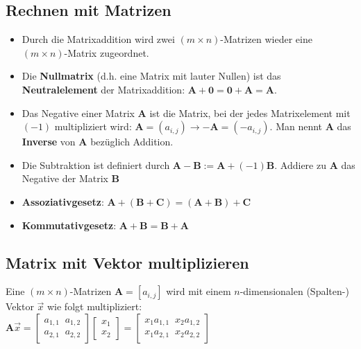 \documentclass[../main.tex]{subfiles}
\begin{document}
\subsection{Rechnen mit Matrizen}
\begin{itemize}
    \item Durch die Matrixaddition wird zwei $(m\times n)$-Matrizen wieder eine $(m\times n)$-Matrix zugeordnet.
    \item Die \textbf{Nullmatrix} (d.h. eine Matrix mit lauter Nullen) ist das \textbf{Neutralelement} der Matrixaddition: $\mathbf{A+0}=\mathbf{0+A}=\mathbf{A}$.
    \item Das Negative einer Matrix \textbf{A} ist die Matrix, bei der jedes Matrixelement mit $(-1)$ multipliziert wird: $\mathbf{A}=(a_{i,j})\to -\mathbf{A}=(-a_{i,j})$. Man nennt $\mathbf{A}$ das \textbf{Inverse} von $\mathbf{A}$ bezüglich Addition.
    \item Die Subtraktion ist definiert durch $\mathbf{A-B}:=\mathbf{A}+(-1)\mathbf{B}$. Addiere zu $\mathbf{A}$ das Negative der Matrix $\mathbf{B}$
    \item \textbf{Assoziativgesetz}: $\mathbf{A}+(\mathbf{B}+\mathbf{C})=(\mathbf{A}+\mathbf{B})+\mathbf{C}$
    \item \textbf{Kommutativgesetz}: $\mathbf{A}+\mathbf{B} = \mathbf{B}+\mathbf{A}$
\end{itemize}

\subsection{Matrix mit Vektor multiplizieren}
Eine $(m\times n)$-Matrizen $\mathbf{A}=[a_{i,j}]$ wird mit einem $n$-dimensionalen (Spalten-) Vektor $\vec{x}$ wie folgt multipliziert: \\ [7pt]

$\mathbf{A} \vec{x}=
\begin{bmatrix}
    a_{1,1} \;\; a_{1,2}\\
    a_{2,1} \;\; a_{2,2} 
\end{bmatrix}
\begin{bmatrix}
    x_{1} \\
    x_{2}
\end{bmatrix} =
\begin{bmatrix}
    x_{1} a_{1,1} \;\; x_{2} a_{1,2}\\
    x_{1} a_{2,1} \;\; x_{2} a_{2,2} 
\end{bmatrix}$
\end{document}
